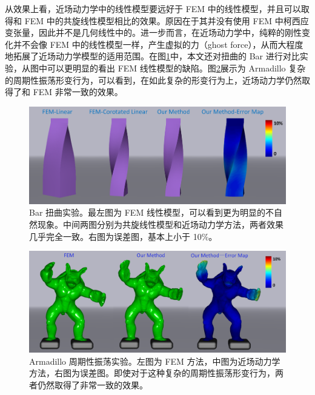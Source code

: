 从效果上看，近场动力学中的线性模型要远好于 FEM 中的线性模型，并且可以取得和 FEM 中的共旋线性模型相比的效果。原因在于其并没有使用 FEM 中柯西应变张量，因此并不是几何线性中的。进一步而言，在近场动力学中，纯粹的刚性变化并不会像 FEM 中的线性模型一样，产生虚拟的力（ghost force），从而大程度地拓展了近场动力学模型的适用范围。在图\ref{demo_bar_twist_vs_fem}中，本文还对扭曲的 Bar 进行对比实验，从图中可以更明显的看出 FEM 线性模型的缺陷。图\ref{demo_armadillo_vs_fem}展示为 Armadillo 复杂的周期性振荡形变行为，可以看到，在如此复杂的形变行为上，近场动力学仍然取得了和 FEM 非常一致的效果。

\begin{figure}[!htb]
  \centering
  \captionsetup{justification=centering}
  \includegraphics[width=0.9\linewidth]{chap/image/demo_bar_twist_vs_fem}

  \caption{\label{demo_bar_twist_vs_fem}
           Bar 扭曲实验。最左图为 FEM 线性模型，可以看到更为明显的不自然现象。中间两图分别为共旋线性模型和近场动力学方法，两者效果几乎完全一致。右图为误差图，基本上小于 10\%。
          }
\end{figure}

\begin{figure}[!htb]
  \centering
  \captionsetup{justification=centering}
  \includegraphics[width=0.9\linewidth]{chap/image/demo_armadillo_vs_fem}

  \caption{\label{demo_armadillo_vs_fem}
           Armadillo 周期性振荡实验。左图为 FEM 方法，中图为近场动力学方法，右图为误差图。即使对于这种复杂的周期性振荡形变行为，两者仍然取得了非常一致的效果。
          }
\end{figure}

